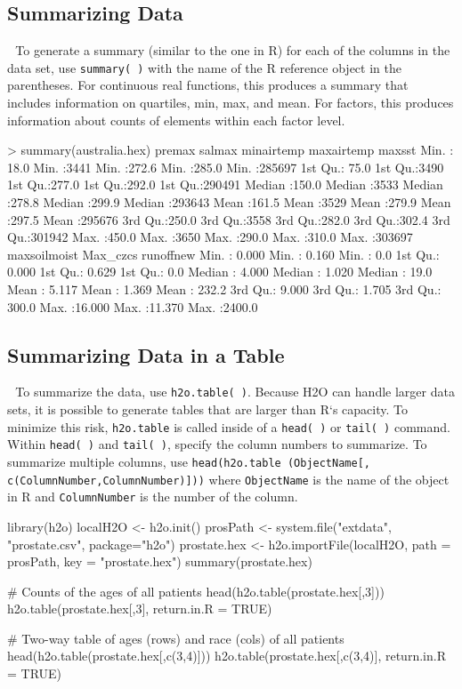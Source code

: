 \documentclass[11pt]{article}
\begin{document}
\subsection{Summarizing Data} 
To generate a summary (similar to the one in R) for each of the columns in the data set, use {\texttt{summary( )}} with the name of the R reference object in the parentheses. 
For continuous real functions, this produces a summary that includes information on quartiles, min, max, and mean. 
For factors, this produces information about counts of elements within each factor level. 

\begin{spverbatim}
> summary(australia.hex)
 premax          salmax         minairtemp      maxairtemp      maxsst          
 Min.   : 18.0   Min.   :3441   Min.   :272.6   Min.   :285.0   Min.   :285697  
 1st Qu.: 75.0   1st Qu.:3490   1st Qu.:277.0   1st Qu.:292.0   1st Qu.:290491  
 Median :150.0   Median :3533   Median :278.8   Median :299.9   Median :293643  
 Mean   :161.5   Mean   :3529   Mean   :279.9   Mean   :297.5   Mean   :295676  
 3rd Qu.:250.0   3rd Qu.:3558   3rd Qu.:282.0   3rd Qu.:302.4   3rd Qu.:301942  
 Max.   :450.0   Max.   :3650   Max.   :290.0   Max.   :310.0   Max.   :303697  
 maxsoilmoist     Max_czcs         runoffnew       
 Min.   : 0.000   Min.   : 0.160   Min.   :   0.0  
 1st Qu.: 0.000   1st Qu.: 0.629   1st Qu.:   0.0  
 Median : 4.000   Median : 1.020   Median :  19.0  
 Mean   : 5.117   Mean   : 1.369   Mean   : 232.2  
 3rd Qu.: 9.000   3rd Qu.: 1.705   3rd Qu.: 300.0  
 Max.   :16.000   Max.   :11.370   Max.   :2400.0  
\end{spverbatim}


\subsection{Summarizing Data in a Table} 
To summarize the data, use {\texttt{h2o.table( )}}. Because H2O can handle larger data sets, it is possible to generate tables that are larger than R`s capacity. To minimize this risk, {\texttt{h2o.table}} is called inside of a {\texttt{head( )}} or {\texttt{tail( )}} command. Within {\texttt{head( )}}  and {\texttt{tail( )}}, specify the column numbers to summarize. 
To summarize multiple columns, use {\texttt{head(h2o.table (ObjectName[, c(ColumnNumber,ColumnNumber)]))}} where {\texttt{ObjectName}} is the name of the object in R and {\texttt{ColumnNumber}} is the number of the column. 

\begin{spverbatim}
library(h2o)
localH2O <- h2o.init()
prosPath <- system.file("extdata", "prostate.csv", package="h2o")
prostate.hex <- h2o.importFile(localH2O, path = prosPath, key = "prostate.hex")
summary(prostate.hex)

# Counts of the ages of all patients
head(h2o.table(prostate.hex[,3]))
h2o.table(prostate.hex[,3], return.in.R = TRUE)

# Two-way table of ages (rows) and race (cols) of all patients
head(h2o.table(prostate.hex[,c(3,4)]))
h2o.table(prostate.hex[,c(3,4)], return.in.R = TRUE)
\end{spverbatim}
\end{document}
